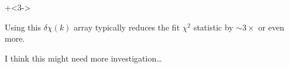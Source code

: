 \begin{frame}
\begin{columns}
\begin{column}[T]{60mm}
    \end{column}

\end{columns}

\vmm

{\onslide+<3-> {

\begin{cenpage}{105mm}

    Using this $\delta\chi(k)$ array typically reduces the fit $\chi^2$
    statistic by $\sim 3\times$ or even more.

    \vmm

    I think this might need more investigation\ldots

\end{cenpage}

}}


\end{frame}
